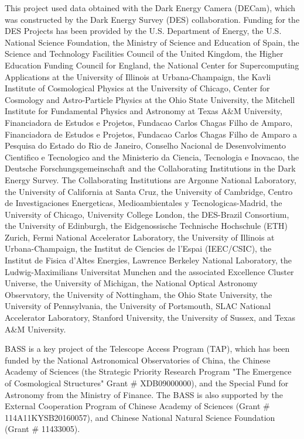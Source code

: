 \documentclass[twocolumn]{aastex62}
\begin{document}
This project used data obtained with the Dark Energy Camera (DECam), which was constructed by the Dark Energy Survey (DES) collaboration. Funding for the DES Projects has been provided by the U.S. Department of Energy, the U.S. National Science Foundation, the Ministry of Science and Education of Spain, the Science and Technology Facilities Council of the United Kingdom, the Higher Education Funding Council for England, the National Center for Supercomputing Applications at the University of Illinois at Urbana-Champaign, the Kavli Institute of Cosmological Physics at the University of Chicago, Center for Cosmology and Astro-Particle Physics at the Ohio State University, the Mitchell Institute for Fundamental Physics and Astronomy at Texas A\&M University, Financiadora de Estudos e Projetos, Fundacao Carlos Chagas Filho de Amparo, Financiadora de Estudos e Projetos, Fundacao Carlos Chagas Filho de Amparo a Pesquisa do Estado do Rio de Janeiro, Conselho Nacional de Desenvolvimento Cientifico e Tecnologico and the Ministerio da Ciencia, Tecnologia e Inovacao, the Deutsche Forschungsgemeinschaft and the Collaborating Institutions in the Dark Energy Survey. The Collaborating Institutions are Argonne National Laboratory, the University of California at Santa Cruz, the University of Cambridge, Centro de Investigaciones Energeticas, Medioambientales y Tecnologicas-Madrid, the University of Chicago, University College London, the DES-Brazil Consortium, the University of Edinburgh, the Eidgenossische Technische Hochschule (ETH) Zurich, Fermi National Accelerator Laboratory, the University of Illinois at Urbana-Champaign, the Institut de Ciencies de l'Espai (IEEC/CSIC), the Institut de Fisica d'Altes Energies, Lawrence Berkeley National Laboratory, the Ludwig-Maximilians Universitat Munchen and the associated Excellence Cluster Universe, the University of Michigan, the National Optical Astronomy Observatory, the University of Nottingham, the Ohio State University, the University of Pennsylvania, the University of Portsmouth, SLAC National Accelerator Laboratory, Stanford University, the University of Sussex, and Texas A\&M University.

BASS is a key project of the Telescope Access Program (TAP), which has been funded by the National Astronomical Observatories of China, the Chinese Academy of Sciences (the Strategic Priority Research Program "The Emergence of Cosmological Structures" Grant \# XDB09000000), and the Special Fund for Astronomy from the Ministry of Finance. The BASS is also supported by the External Cooperation Program of Chinese Academy of Sciences (Grant \# 114A11KYSB20160057), and Chinese National Natural Science Foundation (Grant \# 11433005).
\end{document}
